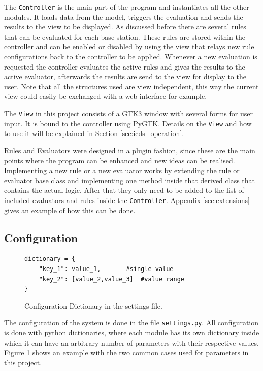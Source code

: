 The \texttt{Controller} is the main part of the program and instantiates all the other modules.
It loads data from the model, triggers the evaluation and sends the results to the view to be displayed.
As discussed before there are several rules that can be evaluated for each base station.
These rules are stored within the controller and can be enabled or disabled by using the view that relays new rule configurations back to the controller to be applied. 
Whenever a new evaluation is requested the controller evaluates the active rules and gives the results to the active evaluator, afterwards the results are send to the view for display to the user.
Note that all the structures used are view independent, this way the current view could easily be exchanged with a web interface for example.

The \texttt{View} in this project consists of a GTK3 window with several forms for user input.
It is bound to the controller using PyGTK.
Details on the \texttt{View} and how to use it will be explained in Section \ref{sec:icds_operation}.

Rules and Evaluators were designed in a plugin fashion, since these are the main points where the program can be enhanced and new ideas can be realised.
Implementing a new rule or a new evaluator works by extending the rule or evaluator base class and implementing one method inside that derived class that contains the actual logic.
After that they only need to be added to the list of included evaluators and rules inside the \texttt{Controller}.
Appendix \ref{sec:extensions} gives an example of how this can be done.

\subsection{Configuration}
\label{sec:configuration}
\begin{figure}
\hspace*{\dimexpr\fboxsep+\fboxrule}%
\begin{minipage}{\dimexpr\textwidth-4\fboxsep-2\fboxrule} 
\begin{lstlisting}
dictionary = {
	"key_1": value_1,		#single value
	"key_2": [value_2,value_3]	#value range
}
\end{lstlisting}
\end{minipage}
\caption{Configuration Dictionary in the settings file.}
\label{fig:python_dict}
\end{figure}
The configuration of the system is done in the file \texttt{settings.py}.
All configuration is done with python dictionaries, where each module has its own dictionary inside which it can have an arbitrary number of parameters with their respective values.
Figure \ref{fig:python_dict} shows an example with the two common cases used for parameters in this project.

